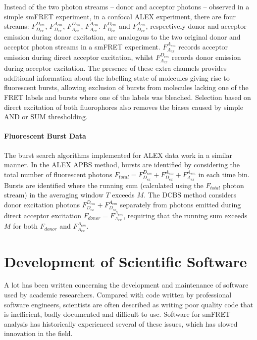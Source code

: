 Instead of the two photon streams -- donor and acceptor photons -- observed in a simple smFRET experiment, in a confocal ALEX experiment, there are four streams: $F_{D_{ex}}^{D_{em}}$, $F_{D_{ex}}^{A_{em}}$, $F_{A_{ex}}^{D_{em}}$, $F_{A_{ex}}^{A_{em}}$. $F_{D_{ex}}^{D_{em}}$ and $F_{D_{ex}}^{A_{em}}$, respectively donor and acceptor emission during donor excitation, are analogous to the two original donor and acceptor photon streams in a smFRET experiment. $F_{A_{ex}}^{A_{em}}$ records acceptor emission during direct acceptor excitation, whilst $F_{A_{ex}}^{D_{em}}$ records donor emission during acceptor excitation. The presence of these extra channels provides additional information about the labelling state of molecules giving rise to fluorescent bursts, allowing exclusion of bursts from molecules lacking one of the FRET labels and bursts where one of the labels was bleached. Selection based on direct excitation of both fluorophores also removes the biases caused by simple AND or SUM thresholding. 

\paragraph{Fluorescent Burst Data}
The burst search algorithms implemented for ALEX data work in a similar manner. In the ALEX APBS method, bursts are identified by considering the total number of fluorescent photons $F_{total} = F_{D_{ex}}^{D_{em}} + F_{D_{ex}}^{A_{em}} + F_{A_{ex}}^{A_{em}}$ in each time bin. Bursts are identified where the running sum (calculated using the  $F_{total}$ photon stream) in the averaging window $T$ exceeds $M$. The DCBS method considers donor excitation photons $F_{D_{ex}}^{D_{em}} + F_{D_{ex}}^{A_{em}}$ separately from photons emitted during direct acceptor excitation $F_{donor} = F_{A_{ex}}^{A_{em}}$, requiring that the running sum exceeds $M$ for both $F_{donor}$ and $F_{A_{ex}}^{A_{em}}$.


\section{Development of Scientific Software}

A lot has been written concerning the development and maintenance of software used by academic researchers. Compared with code written by professional software engineers, scientists are often described as writing poor quality code that is inefficient, badly documented and difficult to use. Software for smFRET analysis has historically experienced several of these issues, which has slowed innovation in the field.

